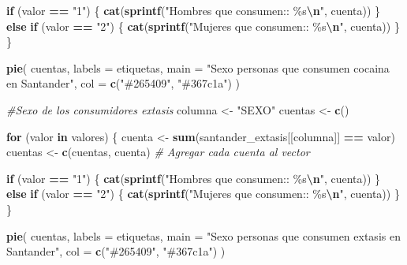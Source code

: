 \documentclass[
]{article}
\newenvironment{Shaded}{\begin{snugshade}}{\end{snugshade}}
\newcommand{\AttributeTok}[1]{\textcolor[rgb]{0.13,0.29,0.53}{#1}}
\newcommand{\CommentTok}[1]{\textcolor[rgb]{0.56,0.35,0.01}{\textit{#1}}}
\newcommand{\ControlFlowTok}[1]{\textcolor[rgb]{0.13,0.29,0.53}{\textbf{#1}}}
\newcommand{\FunctionTok}[1]{\textcolor[rgb]{0.13,0.29,0.53}{\textbf{#1}}}
\newcommand{\NormalTok}[1]{#1}
\newcommand{\OtherTok}[1]{\textcolor[rgb]{0.56,0.35,0.01}{#1}}
\newcommand{\SpecialCharTok}[1]{\textcolor[rgb]{0.81,0.36,0.00}{\textbf{#1}}}
\newcommand{\StringTok}[1]{\textcolor[rgb]{0.31,0.60,0.02}{#1}}
\begin{document}
\begin{Shaded}
\begin{Highlighting}[]
  \ControlFlowTok{if}\NormalTok{ (valor }\SpecialCharTok{==} \StringTok{"1"}\NormalTok{) \{}
    \FunctionTok{cat}\NormalTok{(}\FunctionTok{sprintf}\NormalTok{(}\StringTok{"Hombres que consumen:: \%s}\SpecialCharTok{\textbackslash{}n}\StringTok{"}\NormalTok{, cuenta))}
\NormalTok{  \} }\ControlFlowTok{else} \ControlFlowTok{if}\NormalTok{ (valor }\SpecialCharTok{==} \StringTok{"2"}\NormalTok{) \{}
    \FunctionTok{cat}\NormalTok{(}\FunctionTok{sprintf}\NormalTok{(}\StringTok{"Mujeres que consumen:: \%s}\SpecialCharTok{\textbackslash{}n}\StringTok{"}\NormalTok{, cuenta))}
\NormalTok{  \}}
\NormalTok{\}}

\FunctionTok{pie}\NormalTok{(}
\NormalTok{  cuentas,}
  \AttributeTok{labels =}\NormalTok{ etiquetas,}
  \AttributeTok{main =} \StringTok{"Sexo personas que consumen cocaina en Santander"}\NormalTok{,}
  \AttributeTok{col =} \FunctionTok{c}\NormalTok{(}\StringTok{"\#265409"}\NormalTok{, }\StringTok{"\#367c1a"}\NormalTok{)}
\NormalTok{)}


\CommentTok{\#Sexo de los consumidores extasis }
\NormalTok{columna }\OtherTok{\textless{}{-}} \StringTok{"SEXO"}
\NormalTok{cuentas }\OtherTok{\textless{}{-}} \FunctionTok{c}\NormalTok{()}

\ControlFlowTok{for}\NormalTok{ (valor }\ControlFlowTok{in}\NormalTok{ valores) \{}
\NormalTok{  cuenta }\OtherTok{\textless{}{-}} \FunctionTok{sum}\NormalTok{(santander\_extasis[[columna]] }\SpecialCharTok{==}\NormalTok{ valor)}
\NormalTok{  cuentas }\OtherTok{\textless{}{-}} \FunctionTok{c}\NormalTok{(cuentas, cuenta)  }\CommentTok{\# Agregar cada cuenta al vector}
  
  \ControlFlowTok{if}\NormalTok{ (valor }\SpecialCharTok{==} \StringTok{"1"}\NormalTok{) \{}
    \FunctionTok{cat}\NormalTok{(}\FunctionTok{sprintf}\NormalTok{(}\StringTok{"Hombres que consumen:: \%s}\SpecialCharTok{\textbackslash{}n}\StringTok{"}\NormalTok{, cuenta))}
\NormalTok{  \} }\ControlFlowTok{else} \ControlFlowTok{if}\NormalTok{ (valor }\SpecialCharTok{==} \StringTok{"2"}\NormalTok{) \{}
    \FunctionTok{cat}\NormalTok{(}\FunctionTok{sprintf}\NormalTok{(}\StringTok{"Mujeres que consumen:: \%s}\SpecialCharTok{\textbackslash{}n}\StringTok{"}\NormalTok{, cuenta))}
\NormalTok{  \}}
\NormalTok{\}}

\FunctionTok{pie}\NormalTok{(}
\NormalTok{  cuentas,}
  \AttributeTok{labels =}\NormalTok{ etiquetas,}
  \AttributeTok{main =} \StringTok{"Sexo personas que consumen extasis en Santander"}\NormalTok{,}
  \AttributeTok{col =} \FunctionTok{c}\NormalTok{(}\StringTok{"\#265409"}\NormalTok{, }\StringTok{"\#367c1a"}\NormalTok{)}
\NormalTok{)}


\end{Highlighting}
\end{Shaded}
\end{document}

